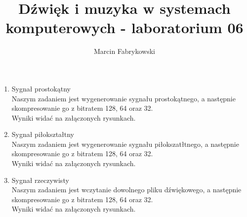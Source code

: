 \documentclass[10pt,a4paper]{article}
\title{Dźwięk i muzyka w systemach komputerowych - laboratorium 06}
\author{Marcin Fabrykowski}
\date{}
\begin{document}
\maketitle
\newpage
\begin{enumerate}
\item Sygnał prostokątny\\
Naszym zadaniem jest wygenerowanie sygnału prostokątnego, a następnie skompresowanie go z bitratem 128, 64 oraz 32.\\
Wyniki widać na załączonych rysunkach.
\item Sygnał piłokształtny\\
Naszym zadaniem jest wygenerowanie sygnału piłokszatłtnego, a następnie skompresowanie go z bitratem 128, 64 oraz 32.\\
Wyniki widać na załączonych rysunkach.
\item Sygnał rzeczywisty\\
Naszym zadaniem jest wczytanie dowolnego pliku dźwiękowego, a następnie skompresowanie go z bitratem 128, 64 oraz 32.\\
Wyniki widać na załączonych rysunkach.
\end{enumerate}
\end{document}
